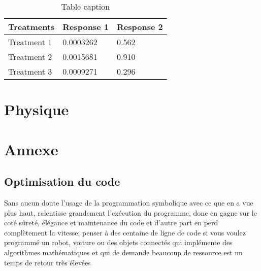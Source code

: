 \documentclass[11pt,fleqn]{book} %
\begin{document}
\begin{table}[h]
\centering
\begin{tabular}{l l l}
\toprule
\textbf{Treatments} & \textbf{Response 1} & \textbf{Response 2}\\
\midrule
Treatment 1 & 0.0003262 & 0.562 \\
Treatment 2 & 0.0015681 & 0.910 \\
Treatment 3 & 0.0009271 & 0.296 \\
\bottomrule
\end{tabular}
\caption{Table caption}
\end{table}

%


\part{Physique}



\part{Annexe}


\chapter{Optimisation du code}
Sans aucun doute l'usage de la programmation symbolique avec ce que en a vue plus haut, ralentisse 
grandement l'exécution du programme, donc en gagne sur le coté sûreté, élégance
et maintenance du code et d'autre part en perd complètement la vitesse; penser à des centaine de ligne 
de code si vous voulez programmé un robot, voiture ou des objets connectés qui implémente des 
algorithmes mathématiques et qui de demande beaucoup de ressource est un temps de retour très élevées 



\end{document}
